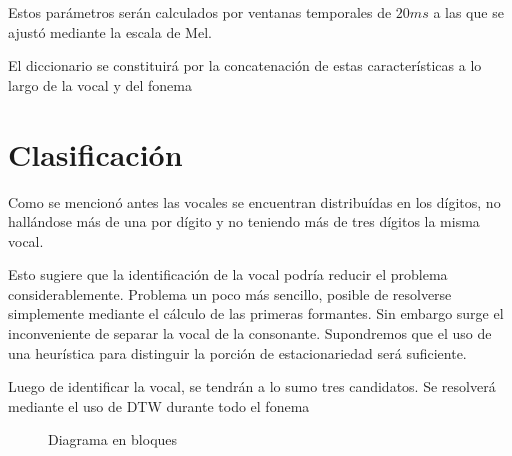 \documentclass[a4paper]{article}
\begin{document}
		Estos parámetros serán calculados por ventanas
		temporales de $20ms$ a las que se ajustó mediante la
		escala de Mel.

		El diccionario se constituirá por la concatenación de
		estas características a lo largo de la vocal y del fonema

	\section{Clasificación}
		Como se mencionó antes las vocales se encuentran
		distribuídas en los dígitos, no hallándose más de
		una por dígito y no teniendo más de tres dígitos la
		misma vocal.

		Esto sugiere que la identificación de la vocal podría
		reducir el problema considerablemente.	Problema un poco
		más sencillo, posible de resolverse simplemente mediante
		el cálculo de las primeras formantes.	Sin embargo surge
		el inconveniente de separar la vocal de la consonante.
		Supondremos que el uso de una heurística para distinguir
		la porción de estacionariedad será suficiente.

		Luego de identificar la vocal, se tendrán a lo sumo
		tres candidatos.  Se resolverá mediante el uso de DTW
		durante todo el fonema

		\begin{figure}
			\fbox{
				
			}
			\caption{Diagrama en bloques}
		\end{figure}

		
	
\end{document}
